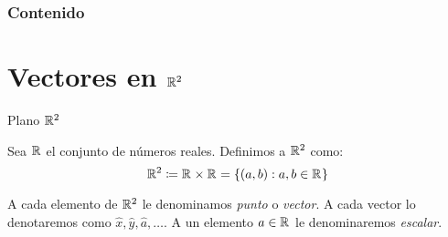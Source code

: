

    \frame{\titlepage}
	\begin{frame}
		\frametitle{Contenido}
		\tableofcontents
	\end{frame}
    \section{Vectores en $\rmath[2]$}
	\begin{frame}{Plano $\rmath[2]$}
	    \begin{mdefinition}
	        Sea $\rmath$ el conjunto de números reales. Definimos a $\rmath[2]$ como:
	        \[\rmath[2]\coloneqq\rmath\times\rmath=\set{(a,b):a,b\in\rmath}\]
	        \begin{figure}
	            \centering
	        \end{figure}
	        A cada elemento de $\rmath[2]$ le denominamos \emph{punto} o \emph{vector}. A cada vector lo denotaremos como $\hat{x},\hat{y},\hat{a},\ldots$. A un elemento $a\in\rmath$ le denominaremos \emph{escalar}.
	    \end{mdefinition}    
	\end{frame}
